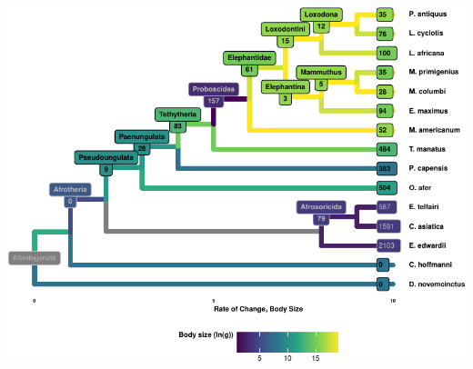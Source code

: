 \documentclass[]{elsarticle} %
\let\origfigure\figure
\let\endorigfigure\endfigure
\renewenvironment{figure}[1][2] {
    \expandafter\origfigure\expandafter[H]
} {
    \endorigfigure
}
\begin{document}
\begin{figure}[H]
\includegraphics[width=6in,height=6in,]{paper_PLOS_draft_files/figure-latex/Figure-GeneDup-Cladogram-1} \caption{Gene duplications occur readily throughout \emph{Atlantogenata}. Shown here is a tree of \emph{Atlantogenatan} species with genomes, with the number of genes that underwent an increase in copy number overlayed at each node.}\label{fig:Figure-GeneDup-Cladogram}
\end{figure}
\end{document}
